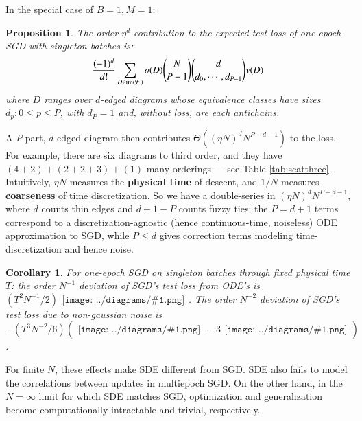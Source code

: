 \documentclass{article}
\newtheorem{cor}{Corollary}
\newtheorem{prop}{Proposition}
\newcommand{\Free}{\mathcal{F}}
\newcommand{\image}{\text{\textnormal{im}}}
\newcommand{\sdia}[1]{\begin{gathered}\texttt{[image: ../diagrams/\#1.png]}\end{gathered}}
\begin{document}
    In the special case of $B=1, M=1$:
    \begin{prop}
        The order $\eta^d$ contribution to the expected test loss of one-epoch
        SGD with singleton batches is:
        \begin{equation}\label{eq:sgdbasiccoef}
            \frac{(-1)^d}{d!} \sum_{D\in \image(\Free)} 
            o(D) {N \choose P-1} {d \choose d_0,\cdots,d_{P-1}}
            v(D)
        \end{equation}
        where $D$ ranges over $d$-edged diagrams whose equivalence classes
        have sizes $d_p: 0\leq p\leq P$, with $d_P=1$
        and, without loss, are each antichains.
    \end{prop}
    A $P$-part, $d$-edged diagram then contributes $\Theta\left((\eta N)^d
    N^{P-d-1}\right)$ to the loss.  For example, there are six diagrams to
    third order, and they have $(4+2)+(2+2+3)+(1)$ many orderings --- see Table
    \ref{tab:scatthree}.  Intuitively, $\eta N$ measures the {\bf physical
    time} of descent, and $1/N$ measures {\bf coarseness} of time
    discretization.  So we have a double-series in $(\eta N)^d
    N^{P-d-1}$, where $d$ counts thin edges and $d+1-P$ counts fuzzy ties; the
    $P=d+1$ terms correspond to a discretization-agnostic (hence
    continuous-time, noiseless) ODE approximation to SGD, while $P\leq d$ gives
    correction terms modeling time-discretization and hence noise.  
    \begin{cor}
        For one-epoch SGD on singleton batches through fixed physical time $T$:
        the order $N^{-1}$ deviation of SGD's test loss from ODE's is
        $
            ({{T^2 N^{-1}}/{2}}) \sdia{c(01-2)(02-12)}
        $.
        The order $N^{-2}$ deviation of SGD's test loss due to non-gaussian
        noise is
        $
            -({{T^3 N^{-2}}/{6}}) (\sdia{c(012-3)(03-13-23)} - 3 \sdia{c(01-2-3)(03-13-23)})
        $.
    \end{cor}
    For finite $N$, these effects make SDE different from SGD.  SDE also fails
    to model the correlations between updates in multiepoch SGD.  On the other
    hand, in the $N=\infty$ limit for which SDE matches SGD, optimization and
    generalization become computationally intractable and trivial,
    respectively. 
\end{document}
